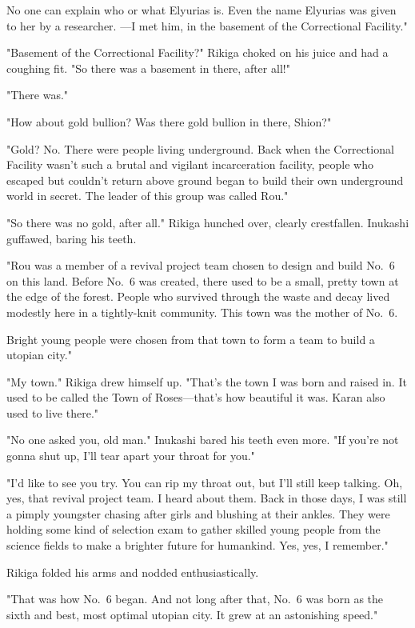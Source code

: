 No one can explain who or what Elyurias is. Even the name Elyurias was
given to her by a researcher. ---I met him, in the basement of the
Correctional Facility."

"Basement of the Correctional Facility?" Rikiga choked on his juice and
had a coughing fit. "So there was a basement in there, after all!"

"There was."

"How about gold bullion? Was there gold bullion in there, Shion?"

"Gold? No. There were people living underground. Back when the
Correctional Facility wasn't such a brutal and vigilant incarceration
facility, people who escaped but couldn't return above ground began to
build their own underground world in secret. The leader of this group
was called Rou."

"\el So there was no gold, after all." Rikiga hunched over, clearly
crestfallen. Inukashi guffawed, baring his teeth.

"Rou was a member of a revival project team chosen to design and build
No.~6 on this land. Before No.~6 was created, there used to be a small,
pretty town at the edge of the forest. People who survived through the
waste and decay lived modestly here in a tightly-knit community. This
town was the mother of No.~6.

Bright young people were chosen from that town to form a team to build a
utopian city."

"My town." Rikiga drew himself up. "That's the town I was born and
raised in. It used to be called the Town of Roses---that's how beautiful
it was. Karan also used to live there."

"No one asked you, old man." Inukashi bared his teeth even more. "If
you're not gonna shut up, I'll tear apart your throat for you."

"I'd like to see you try. You can rip my throat out, but I'll still keep
talking. Oh, yes, that revival project team. I heard about them. Back in
those days, I was still a pimply youngster chasing after girls and
blushing at their ankles. They were holding some kind of selection exam
to gather skilled young people from the science fields to make a
brighter future for humankind. Yes, yes, I remember."

Rikiga folded his arms and nodded enthusiastically.

"That was how No.~6 began. And not long after that, No.~6 was born as
the sixth and best, most optimal utopian city. It grew at an astonishing
speed."

